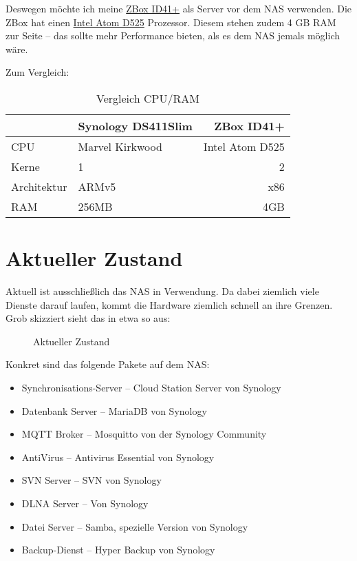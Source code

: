 \documentclass[12pt,a4paper,ngerman]{article}
\newcommand{\jpaimg}[2]{\begin{figure}[H]\centering\fbox{\texttt{[image: \#1]}}\caption{#2}\label{fig:#2}\end{figure}}
\begin{document}
Deswegen möchte ich meine
\href{https://www.zotac.com/us/product/mini_pcs/id41-plus}{ZBox ID41+}
als Server vor dem NAS verwenden. Die ZBox hat einen
\href{https://de.wikipedia.org/wiki/Intel_Atom}{Intel Atom D525} Prozessor.
Diesem stehen zudem 4 GB RAM zur Seite -- das sollte mehr Performance bieten,
als es dem NAS jemals möglich wäre.

Zum Vergleich:

\begin{table}[H]
    \centering
    \begin{tabular}{@{}llr@{}}
        \toprule
                    & Synology DS411Slim & ZBox ID41+      \\
        \midrule
        CPU         & Marvel Kirkwood    & Intel Atom D525 \\
        Kerne       & 1                  & 2               \\
        Architektur & ARMv5              & x86             \\
        RAM         & 256MB              & 4GB             \\
        \bottomrule
    \end{tabular}
    \caption{Vergleich CPU/RAM}\label{tab:Vergleich CPU/RAM}
\end{table}

\section{Aktueller Zustand}
Aktuell ist ausschließlich das NAS in Verwendung. Da dabei ziemlich viele
Dienste darauf laufen, kommt die Hardware ziemlich schnell an ihre Grenzen.
Grob skizziert sieht das in etwa so aus:

\jpaimg{./images/DS411Slim.png}{Aktueller Zustand}

Konkret sind das folgende Pakete auf dem NAS:\@

\begin{itemize}
    \item Synchronisations-Server -- Cloud Station Server von Synology
    \item Datenbank Server -- MariaDB von Synology
    \item MQTT Broker -- Mosquitto von der Synology Community
    \item AntiVirus -- Antivirus Essential von Synology
    \item SVN Server -- SVN von Synology
    \item DLNA Server -- Von Synology
    \item Datei Server -- Samba, spezielle Version von Synology
    \item Backup-Dienst -- Hyper Backup von Synology
\end{itemize}
\end{document}
